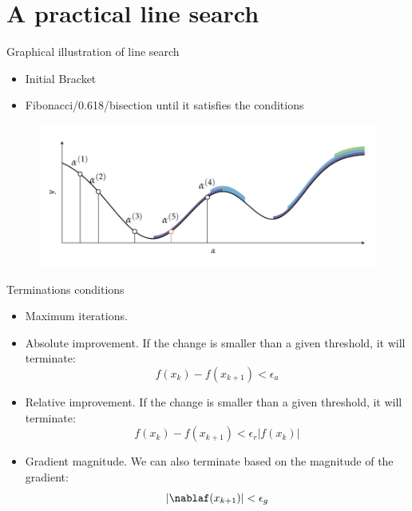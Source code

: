\documentclass{beamer}
\begin{document}
\section{A practical line search}
\begin{frame}{Graphical illustration of line search}

\begin{itemize}
    \item Initial Bracket
    \item Fibonacci/0.618/bisection until it satisfies the conditions
\end{itemize}

\begin{figure}
\centering
\includegraphics[width=120mm]{Figs/linesearch.jpeg}
\end{figure}

\end{frame}

\begin{frame}{Terminations conditions}
\begin{itemize}
    \item Maximum iterations.
    \item Absolute improvement. If the change is smaller than a given threshold, it will terminate:
    \begin{equation*}
        f(x_k) - f(x_{k+1}) < \epsilon_a
    \end{equation*}
    
    \item Relative improvement. If the change is smaller than a given threshold, it will terminate:
    \begin{equation*}
        f(x_k) - f(x_{k+1}) < \epsilon_r |f(x_k)|
    \end{equation*}
    
    \item Gradient magnitude. We can also terminate based on the magnitude of the gradient:
        \begin{equation*}
            |\nablaf(x_{k+1})| < \epsilon_g 
        \end{equation*}
\end{itemize}

\end{frame}
\end{document}
